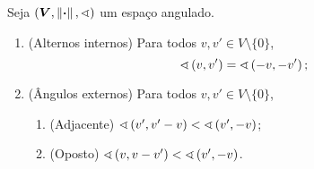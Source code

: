 \begin{exercise}
Seja $(\bm V, \left\Vert{\bm{\cdot}}\right\Vert,\sphericalangle)$ um espaço angulado.
	\begin{enumerate}
	\item (Alternos internos) Para todos $v,v' \in V \setminus \{0\}$,
			\begin{equation*}
			\sphericalangle\left({v},{v'}\right) = \sphericalangle\left({-v},{-v'}\right);
			\end{equation*}
	
	\item (Ângulos externos) Para todos $v,v' \in V \setminus \{0\}$,
			\begin{enumerate}
			\item (Adjacente) $\sphericalangle\left({v'},{v'-v}\right) < \sphericalangle\left({v'},{-v}\right)$;
			\item (Oposto) $\sphericalangle\left({v},{v-v'}\right) < \sphericalangle\left({v'},{-v}\right)$.
			\end{enumerate}
	\end{enumerate}
\end{exercise}

